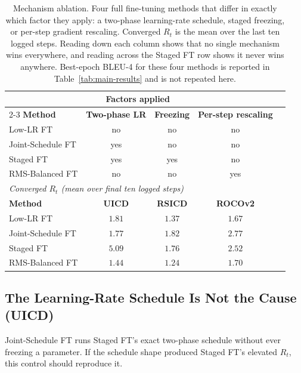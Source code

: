 \documentclass[journal]{IEEEtran}
\begin{document}
\begin{table}[!htbp]
\centering
\caption{Mechanism ablation. Four full fine-tuning methods that
differ in exactly which factor they apply: a two-phase
learning-rate schedule, staged freezing, or per-step gradient
rescaling. Converged $R_t$ is the mean over the last ten logged
steps. Reading down each
column shows that no single mechanism wins everywhere, and
reading across the Staged FT row shows it never wins anywhere.
Best-epoch BLEU-4 for these four methods is reported in
Table~\ref{tab:main-results} and is not repeated here.}
\label{tab:ablation-four-way}
\begin{tabular}{lcccc}
\toprule
& \multicolumn{2}{c}{\textbf{Factors applied}} & & \\
\cmidrule(lr){2-3}
\textbf{Method} & \textbf{Two-phase LR} & \textbf{Freezing}
& \textbf{Per-step rescaling} & \\
\midrule
Low-LR FT          & no  & no  & no  & \\
Joint-Schedule FT  & yes & no  & no  & \\
Staged FT          & yes & yes & no  & \\
RMS-Balanced FT    & no  & no  & yes & \\
\midrule
\multicolumn{5}{l}{\emph{Converged $R_t$ (mean over final ten logged steps)}} \\
\midrule
\textbf{Method} & \textbf{UICD} & \textbf{RSICD} & \textbf{ROCOv2} & \\
\midrule
Low-LR FT         & $1.81$ & $1.37$ & $1.67$ & \\
Joint-Schedule FT & $1.77$ & $1.82$ & $2.77$ & \\
Staged FT         & $5.09$ & $1.76$ & $2.52$ & \\
RMS-Balanced FT   & $1.44$ & $1.24$ & $1.70$ & \\
\bottomrule
\end{tabular}
\end{table}

\subsection{The Learning-Rate Schedule Is Not the Cause (UICD)}
Joint-Schedule FT runs Staged FT's exact two-phase schedule without
ever freezing a parameter. If the schedule shape produced Staged FT's
elevated $R_t$, this control should reproduce it.
\end{document}
